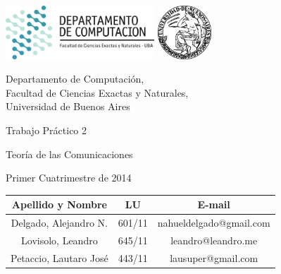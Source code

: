 \documentclass[a4paper, 10pt, twoside]{article}
\begin{document}


\thispagestyle{caratula}

\begin{center}

\includegraphics[height=2cm]{DC.png} 
\hfill
\includegraphics[height=2cm]{UBA.jpg} 

\vspace{2cm}

Departamento de Computación,\\
Facultad de Ciencias Exactas y Naturales,\\
Universidad de Buenos Aires

\vspace{4cm}

\begin{Huge}
Trabajo Práctico 2
\end{Huge}

\vspace{0.5cm}

\begin{Large}
Teoría de las Comunicaciones
\end{Large}

\vspace{1cm}

Primer Cuatrimestre de 2014

\vspace{4cm}

\begin{tabular}{|c|c|c|}
\hline
Apellido y Nombre & LU & E-mail\\
\hline
Delgado, Alejandro N.  & 601/11 & nahueldelgado@gmail.com\\
Lovisolo, Leandro      & 645/11 & leandro@leandro.me\\
Petaccio, Lautaro José & 443/11 & lausuper@gmail.com\\
\hline
\end{tabular}

\end{center}
\end{document}
